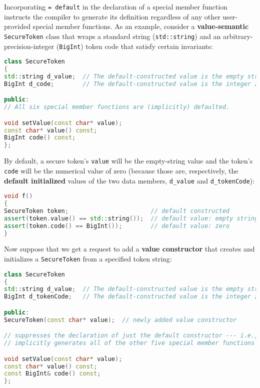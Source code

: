Incorporating \texttt{=}~\texttt{default} in the declaration of a
special member function instructs the compiler to generate its
definition regardless of any other user-provided special member
functions. As an example, consider a \textbf{value-semantic}
\texttt{SecureToken} class that wraps a standard string
(\texttt{std::string}) and an arbitrary-precision-integer
(\texttt{BigInt}) token code that satisfy certain invariants:

\begin{lstlisting}[language=C++]
class SecureToken
{
std::string d_value;  // The default-constructed value is the empty string.
BigInt d_code;        // The default-constructed value is the integer zero.

public:
// All six special member functions are (implicitly) defaulted.

void setValue(const char* value);
const char* value() const;
BigInt code() const;
};
\end{lstlisting}

\noindent By default, a secure token's \texttt{value} will be the empty-string
value and the token's \texttt{code} will be the numerical value of zero
(because those are, respectively, the \textbf{default initialized} values
of the two data members, \texttt{d\_value} and \texttt{d\_tokenCode}):

\begin{lstlisting}[language=C++,label=default-voidf-code]
void f()
{
SecureToken token;                       // default constructed         (1)
assert(token.value() == std::string());  // default value: empty string (2)
assert(token.code() == BigInt());        // default value: zero         (3)
}
\end{lstlisting}

\noindent Now suppose that we get a request to add a \textbf{value constructor}
that creates and initializes a \texttt{SecureToken} from a specified
token string:

\begin{lstlisting}[language=C++]
class SecureToken
{
std::string d_value;  // The default-constructed value is the empty string.
BigInt d_tokenCode;   // The default-constructed value is the integer zero.

public:
SecureToken(const char* value);  // newly added value constructor

// suppresses the declaration of just the default constructor --- i.e.,
// implicitly generates all of the other five special member functions

void setValue(const char* value);
const char* value() const;
const BigInt& code() const;
};
\end{lstlisting}

